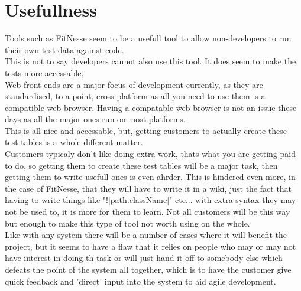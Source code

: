 \documentclass{article}
\begin{document}
\section{Usefullness}
Tools such as FitNesse seem to be a usefull tool to allow non-developers to run their own test data against code.
\\This is not to say developers cannot also use this tool.  It does seem to make the tests more accessable.
\\Web front ends are a major focus of development currently, as they are standardised, to a point, cross platform as all you need to use them is a compatible web browser.  Having a compatable web browser is not an issue these days as all the major ones run on most platforms.
\\This is all nice and accessable, but, getting customers to actually create these test tables is a whole different matter.
\\Customers typicaly don't like doing extra work, thats what you are getting paid to do, so getting them to create these test tables will be a major task, then getting them to write usefull ones is even ahrder.  This is hindered even more, in the case of FitNesse, that they will have to write it in a wiki, just the fact that having to write things like "!|path.className|" etc... with extra syntax they may not be used to, it is more for them to learn.  Not all customers will be this way but enough to make this type of tool not worth using on the whole.
\\Like with any system there will be a number of cases where it will benefit the project, but it seems to have a flaw that it relies on people who may or may not have interest in doing th task or will just hand it off to somebody else which defeats the point of the system all together, which is to have the customer give quick feedback and 'direct' input into the system to aid agile development.




\end{document}
